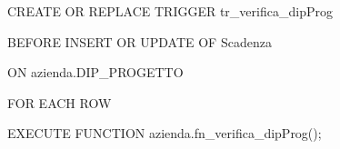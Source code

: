     \ttfamily
        \begin{flushleft}
            \begin{description}
                \item CREATE OR REPLACE TRIGGER tr\_verifica\_dipProg
                \item BEFORE INSERT OR UPDATE OF Scadenza
                \item ON azienda.DIP\_PROGETTO
                \item FOR EACH ROW
                \item EXECUTE FUNCTION azienda.fn\_verifica\_dipProg();
            \end{description}
        \end{flushleft}
    \normalfont



